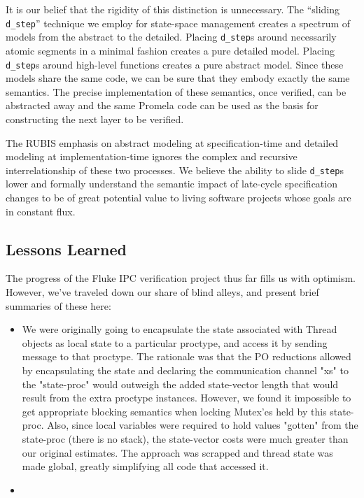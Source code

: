 It is our belief that the rigidity of this distinction is unnecessary.
The ``sliding {\tt d_step}'' technique we employ for state-space
management creates a spectrum of models from the abstract to the
detailed.  Placing {\tt d_step}s around necessarily atomic segments in
a minimal fashion creates a pure detailed model.  Placing {\tt
d_step}s around high-level functions creates a pure abstract model.
Since these models share the same code, we can be sure that they
embody exactly the same semantics.  The precise implementation of
these semantics, once verified, can be abstracted away and the same
Promela code can be used as the basis for constructing the next layer
to be verified.

The RUBIS emphasis on abstract modeling at specification-time and detailed
modeling at implementation-time ignores the complex and recursive
interrelationship of these two processes.  We believe the ability to slide
{\tt d_step}s lower and formally understand the semantic impact of late-cycle
specification changes to be of great potential value to living software
projects whose goals are in constant flux.


\subsection{Lessons Learned}

The progress of the Fluke IPC verification project thus far fills us with
optimism.  However, we've traveled down our share of blind alleys, and
present brief summaries of these here:

\begin{itemize}

\item
We were originally going to encapsulate the state associated with
Thread objects as local state to a particular proctype, and access it
by sending message to that proctype.  The rationale was that the PO
reductions allowed by encapsulating the state and declaring the
communication channel "xs" to the "state-proc" would outweigh the
added state-vector length that would result from the extra proctype
instances.  However, we found it impossible to get appropriate
blocking semantics when locking Mutex'es held by this state-proc.
Also, since local variables were required to hold values "gotten" from
the state-proc (there is no stack), the state-vector costs were much
greater than our original estimates.  The approach was scrapped and
thread state was made global, greatly simplifying all code that
accessed it.

\item
{}

\end{itemize}

